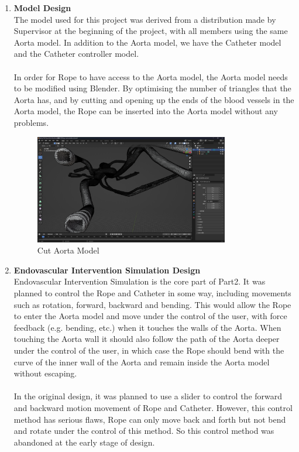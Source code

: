 \documentclass[12pt]{article}
\begin{document}
\begin{enumerate}
      \item \textbf{Model Design}
      \\
      The model used for this project was derived from a distribution made by Supervisor at the beginning of the project, with all members using the same Aorta model. In addition to the Aorta model, we have the Catheter model and the Catheter controller model.
      \\\\
      In order for Rope to have access to the Aorta model, the Aorta model needs to be modified using Blender. By optimising the number of triangles that the Aorta has, and by cutting and opening up the ends of the blood vessels in the Aorta model, the Rope can be inserted into the Aorta model without any problems.
      \begin{figure}[H]
            \centering
            \includegraphics[width=0.8\textwidth]{blender cut.png}
            \caption{Cut Aorta Model}
      \end{figure}
      \item \textbf{Endovascular Intervention Simulation Design}
      \\
      Endovascular Intervention Simulation is the core part of Part2. It was planned to control the Rope and Catheter in some way, including movements such as rotation, forward, backward and bending. This would allow the Rope to enter the Aorta model and move under the control of the user, with force feedback (e.g. bending, etc.) when it touches the walls of the Aorta. When touching the Aorta wall it should also follow the path of the Aorta deeper under the control of the user, in which case the Rope should bend with the curve of the inner wall of the Aorta and remain inside the Aorta model without escaping.
      \\\\
      In the original design, it was planned to use a slider to control the forward and backward motion movement of Rope and Catheter. However, this control method has serious flaws, Rope can only move back and forth but not bend and rotate under the control of this method. So this control method was abandoned at the early stage of design.

\end{enumerate}
\end{document}
